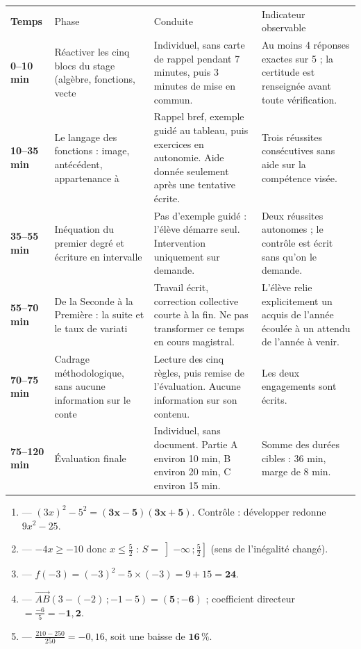 \documentclass[10pt,a4paper]{article}
\begin{document}
\newpage{}
\par\noindent\begin{tabularx}{\linewidth}{>{\bfseries}p{18mm} p{34mm} X X}
\rowcolor{Navy}\color{white}Temps & \color{white}Phase & \color{white}Conduite & \color{white}Indicateur observable \\
0--10 min & Réactiver les cinq blocs du stage (algèbre, fonctions, vecte & Individuel, sans carte de rappel pendant 7 minutes, puis 3 minutes de mise en commun. & Au moins 4 réponses exactes sur 5 ; la certitude est renseignée avant toute vérification. \\
10--35 min & Le langage des fonctions : image, antécédent, appartenance à & Rappel bref, exemple guidé au tableau, puis exercices en autonomie. Aide donnée seulement après une tentative écrite. & Trois réussites consécutives sans aide sur la compétence visée. \\
35--55 min & Inéquation du premier degré et écriture en intervalle & Pas d'exemple guidé : l'élève démarre seul. Intervention uniquement sur demande. & Deux réussites autonomes ; le contrôle est écrit sans qu'on le demande. \\
55--70 min & De la Seconde à la Première : la suite et le taux de variati & Travail écrit, correction collective courte à la fin. Ne pas transformer ce temps en cours magistral. & L'élève relie explicitement un acquis de l'année écoulée à un attendu de l'année à venir. \\
70--75 min & Cadrage méthodologique, sans aucune information sur le conte & Lecture des cinq règles, puis remise de l'évaluation. Aucune information sur son contenu. & Les deux engagements sont écrits. \\
75--120 min & Évaluation finale & Individuel, sans document. Partie A environ 10 min, B environ 20 min, C environ 15 min. & Somme des durées cibles : 36 min, marge de 8 min. \\
\end{tabularx}
\newpage{}
\begin{enumerate}
\item {} --- $(3x)^2-5^2=\mathbf{(3x-5)(3x+5)}$. Contrôle : développer redonne $9x^2-25$.
\item {} --- $-4x\ge -10$ donc $x\le \frac52$ : $S=\left]-\infty\,;\tfrac52\right]$ (sens de l'inégalité changé).
\item {} --- $f(-3)=(-3)^2-5\times(-3)=9+15=\mathbf{24}$.
\item {} --- $\vec{AB}(3-(-2)\,;-1-5)=\mathbf{(5\,;-6)}$ ; coefficient directeur $=\frac{-6}{5}=\mathbf{-1{,}2}$.
\item {} --- $\frac{210-250}{250}=-0{,}16$, soit une baisse de $\mathbf{16\,\%}$.
\end{enumerate}
\end{document}

